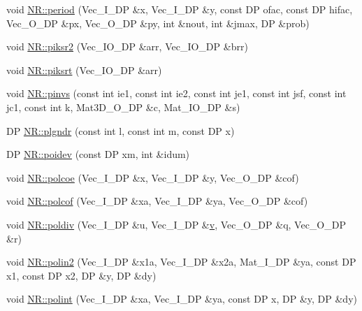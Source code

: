\begin{DoxyCompactItemize}
\item 
void \mbox{\hyperlink{namespaceNR_aed0c7ecfa8b01342146d1d0dff6befca}{N\+R\+::period}} (Vec\+\_\+\+I\+\_\+\+DP \&x, Vec\+\_\+\+I\+\_\+\+DP \&y, const DP ofac, const DP hifac, Vec\+\_\+\+O\+\_\+\+DP \&px, Vec\+\_\+\+O\+\_\+\+DP \&py, int \&nout, int \&jmax, DP \&prob)
\item 
void \mbox{\hyperlink{namespaceNR_ab0ef3238c95aeadb917a97ef14a41b29}{N\+R\+::piksr2}} (Vec\+\_\+\+I\+O\+\_\+\+DP \&arr, Vec\+\_\+\+I\+O\+\_\+\+DP \&brr)
\item 
void \mbox{\hyperlink{namespaceNR_a11f36d67ab2adaed64b8f5dbfbbf2efc}{N\+R\+::piksrt}} (Vec\+\_\+\+I\+O\+\_\+\+DP \&arr)
\item 
void \mbox{\hyperlink{namespaceNR_a34209b0a9d44aa222a5f76c3c7bdeeaa}{N\+R\+::pinvs}} (const int ie1, const int ie2, const int je1, const int jsf, const int jc1, const int k, Mat3\+D\+\_\+\+O\+\_\+\+DP \&c, Mat\+\_\+\+I\+O\+\_\+\+DP \&s)
\item 
DP \mbox{\hyperlink{namespaceNR_a677f4e9cdd801b4a29b667ac6915ac26}{N\+R\+::plgndr}} (const int l, const int m, const DP x)
\item 
DP \mbox{\hyperlink{namespaceNR_a0612378e73208e941cd53484771f52bb}{N\+R\+::poidev}} (const DP xm, int \&idum)
\item 
void \mbox{\hyperlink{namespaceNR_a404e4e04344a84403f08fcd906a91b2d}{N\+R\+::polcoe}} (Vec\+\_\+\+I\+\_\+\+DP \&x, Vec\+\_\+\+I\+\_\+\+DP \&y, Vec\+\_\+\+O\+\_\+\+DP \&cof)
\item 
void \mbox{\hyperlink{namespaceNR_af2c475d479fbaa639b53b606796608c6}{N\+R\+::polcof}} (Vec\+\_\+\+I\+\_\+\+DP \&xa, Vec\+\_\+\+I\+\_\+\+DP \&ya, Vec\+\_\+\+O\+\_\+\+DP \&cof)
\item 
void \mbox{\hyperlink{namespaceNR_a2ec54779e5505f4a702196d44766e022}{N\+R\+::poldiv}} (Vec\+\_\+\+I\+\_\+\+DP \&u, Vec\+\_\+\+I\+\_\+\+DP \&\mbox{\hyperlink{adat__devel_2lib_2hadron_2hadron__timeslice_8cc_a716fc87f5e814be3ceee2405ed6ff22a}{v}}, Vec\+\_\+\+O\+\_\+\+DP \&q, Vec\+\_\+\+O\+\_\+\+DP \&r)
\item 
void \mbox{\hyperlink{namespaceNR_adfe1a6957b3044f86a5d9b2cb071edbf}{N\+R\+::polin2}} (Vec\+\_\+\+I\+\_\+\+DP \&x1a, Vec\+\_\+\+I\+\_\+\+DP \&x2a, Mat\+\_\+\+I\+\_\+\+DP \&ya, const DP x1, const DP x2, DP \&y, DP \&dy)
\item 
void \mbox{\hyperlink{namespaceNR_ab748a48a0cfdc9215829774ddf25ea90}{N\+R\+::polint}} (Vec\+\_\+\+I\+\_\+\+DP \&xa, Vec\+\_\+\+I\+\_\+\+DP \&ya, const DP x, DP \&y, DP \&dy)
\item 

\end{DoxyCompactItemize}
